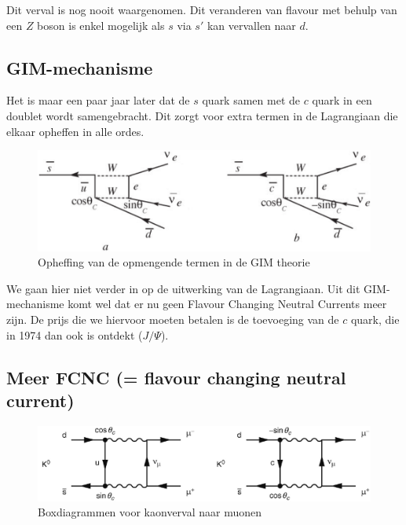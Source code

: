 \documentclass[../main.tex]{subfiles}
\begin{document}
Dit verval is nog nooit waargenomen. Dit veranderen van flavour met behulp van een $Z$ boson is enkel mogelijk als $s$ via $s'$ kan vervallen naar $d$.

\subsection{GIM-mechanisme}%
\label{sub:gim_mechanisme}

Het is maar een paar jaar later dat de $s$ quark samen met de $c$ quark in een doublet wordt samengebracht. Dit zorgt voor extra termen in de Lagrangiaan die elkaar opheffen in alle ordes.

\begin{figure}[h]
    \centering
    \includegraphics[width=0.6\linewidth]{meson_mixing_and_oscillations/gim_opheffing.png}
    \caption{Opheffing van de opmengende termen in de GIM theorie}%
    \label{fig:meson_mixing_and_oscillations/gim_opheffing}
\end{figure}

We gaan hier niet verder in op de uitwerking van de Lagrangiaan. Uit dit GIM-mechanisme komt wel dat er nu geen Flavour Changing Neutral Currents meer zijn. De prijs die we hiervoor moeten betalen is de toevoeging van de $c$ quark, die in 1974 dan ook is ontdekt ($J/\Psi$).

\subsection{Meer FCNC (= flavour changing neutral current)}%
\label{sub:meer_fcnc}

\begin{figure}[h]
    \centering
    \includegraphics[width=0.8\linewidth]{meson_mixing_and_oscillations/fcnc.png}
    \caption{Boxdiagrammen voor kaonverval naar muonen}%
    \label{fig:meson_mixing_and_oscillations/fcnc}
\end{figure}
\end{document}
